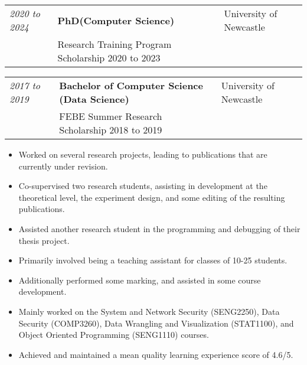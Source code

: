 \documentclass{myresume}
\begin{document}

        \begin{tabularx}{\textwidth}{ >{\hsize=0.25\hsize}X  >{\hsize=0.5\hsize}X >{\hsize=0.25\hsize}X }
                \textit{2020 to 2024} & \textbf{PhD(Computer Science)} & University of Newcastle \\
            & Research Training Program Scholarship 2020 to 2023 & \\
        \end{tabularx}

        \begin{tabularx}{\textwidth}{ >{\hsize=0.25\hsize}X  >{\hsize=0.5\hsize}X >{\hsize=0.25\hsize}X }
            \textit{2017 to 2019} & \textbf{Bachelor of Computer Science (Data Science)} & University of Newcastle \\
            & FEBE Summer Research Scholarship 2018 to 2019 & \\
        \end{tabularx}

            \begin{itemize}
                \item Worked on several research projects, leading to publications that are currently under revision.

                \item Co-supervised two research students, assisting in development at the theoretical level, the experiment design, and some editing of the resulting publications.

                \item Assisted another research student in the programming and debugging of their thesis project.
            \end{itemize}

            \begin{itemize}
                \item Primarily involved being a teaching assistant for classes of 10-25 students.

                \item Additionally performed some marking, and assisted in some course development.

                \item Mainly worked on the System and Network Security (SENG2250), Data Security (COMP3260), Data Wrangling and Visualization (STAT1100), and Object Oriented Programming (SENG1110) courses.

                \item Achieved and maintained a mean quality learning experience score of 4.6/5.
            \end{itemize}
\end{document}
